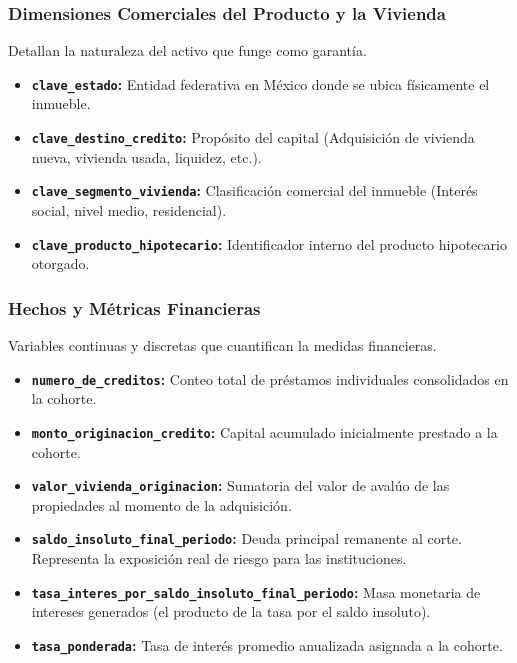 \subsubsection*{Dimensiones Comerciales del Producto y la Vivienda}
Detallan la naturaleza del activo que funge como garantía.
\begin{itemize}
	\item \textbf{\texttt{clave\_estado}:} Entidad federativa en México donde se ubica físicamente el inmueble.
	\item \textbf{\texttt{clave\_destino\_credito}:} Propósito del capital (Adquisición de vivienda nueva, vivienda usada, liquidez, etc.).
	\item \textbf{\texttt{clave\_segmento\_vivienda}:} Clasificación comercial del inmueble (Interés social, nivel medio, residencial).
	\item \textbf{\texttt{clave\_producto\_hipotecario}:} Identificador interno del producto hipotecario otorgado.
\end{itemize}

\subsubsection*{Hechos y Métricas Financieras}
Variables continuas y discretas que cuantifican la medidas financieras.
\begin{itemize}
	\item \textbf{\texttt{numero\_de\_creditos}:} Conteo total de préstamos individuales consolidados en la cohorte.
	\item \textbf{\texttt{monto\_originacion\_credito}:} Capital acumulado inicialmente prestado a la cohorte.
	\item \textbf{\texttt{valor\_vivienda\_originacion}:} Sumatoria del valor de avalúo de las propiedades al momento de la adquisición.
	\item \textbf{\texttt{saldo\_insoluto\_final\_periodo}:} Deuda principal remanente al corte. Representa la exposición real de riesgo para las instituciones.
	\item \textbf{\texttt{tasa\_interes\_por\_saldo\_insoluto\_final\_periodo}:} Masa monetaria de intereses generados (el producto de la tasa por el saldo insoluto).
	\item \textbf{\texttt{tasa\_ponderada}:} Tasa de interés promedio anualizada asignada a la cohorte.
\end{itemize}


